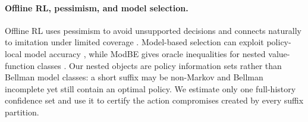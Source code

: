 \documentclass[letterpaper]{article} %
\theoremstyle{remark}
\begin{document}
\paragraph{Offline RL, pessimism, and model selection.}
Offline RL uses pessimism to avoid unsupported decisions
\citep{jin2021pessimism,shi2022pessimistic} and connects naturally to
imitation under limited coverage \citep{rashidinejad2021bridging}. Model-based
selection can exploit policy-local model accuracy \citep{dong2023local}, while
ModBE gives oracle inequalities for nested value-function classes
\citep{lee2022oracle}. Our nested objects are policy information sets rather
than Bellman model classes: a short suffix may be non-Markov and Bellman
incomplete yet still contain an optimal policy. We estimate only one
full-history confidence set and use it to certify the action compromises
created by every suffix partition.
\end{document}
